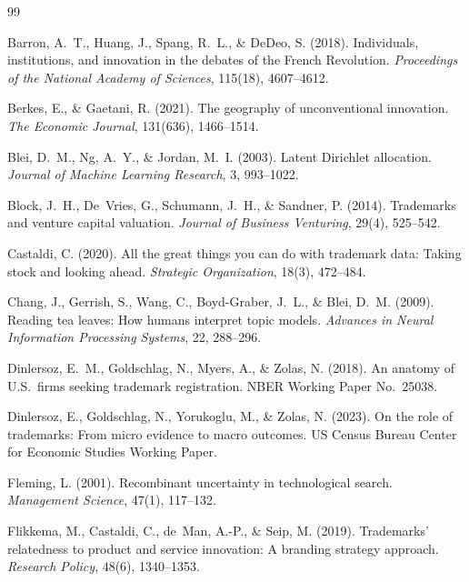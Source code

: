 \begin{thebibliography}{99}

Barron, A.~T., Huang, J., Spang, R.~L., \& DeDeo, S. (2018). Individuals,
institutions, and innovation in the debates of the French Revolution.
\emph{Proceedings of the National Academy of Sciences}, 115(18),
4607--4612.

Berkes, E., \& Gaetani, R. (2021). The geography of unconventional
innovation. \emph{The Economic Journal}, 131(636), 1466--1514.

Blei, D.~M., Ng, A.~Y., \& Jordan, M.~I. (2003). Latent Dirichlet
allocation. \emph{Journal of Machine Learning Research}, 3, 993--1022.

Block, J.~H., De~Vries, G., Schumann, J.~H., \& Sandner, P. (2014).
Trademarks and venture capital valuation. \emph{Journal of Business
Venturing}, 29(4), 525--542.

Castaldi, C. (2020). All the great things you can do with trademark data:
Taking stock and looking ahead. \emph{Strategic Organization}, 18(3),
472--484.

Chang, J., Gerrish, S., Wang, C., Boyd-Graber, J.~L., \& Blei, D.~M.
(2009). Reading tea leaves: How humans interpret topic models.
\emph{Advances in Neural Information Processing Systems}, 22, 288--296.

Dinlersoz, E.~M., Goldschlag, N., Myers, A., \& Zolas, N. (2018). An
anatomy of U.S.\ firms seeking trademark registration. NBER Working Paper
No.\ 25038.

Dinlersoz, E., Goldschlag, N., Yorukoglu, M., \& Zolas, N. (2023). On the
role of trademarks: From micro evidence to macro outcomes. US Census
Bureau Center for Economic Studies Working Paper.

Fleming, L. (2001). Recombinant uncertainty in technological search.
\emph{Management Science}, 47(1), 117--132.

Flikkema, M., Castaldi, C., de~Man, A.-P., \& Seip, M. (2019). Trademarks'
relatedness to product and service innovation: A branding strategy
approach. \emph{Research Policy}, 48(6), 1340--1353.


\end{thebibliography}
